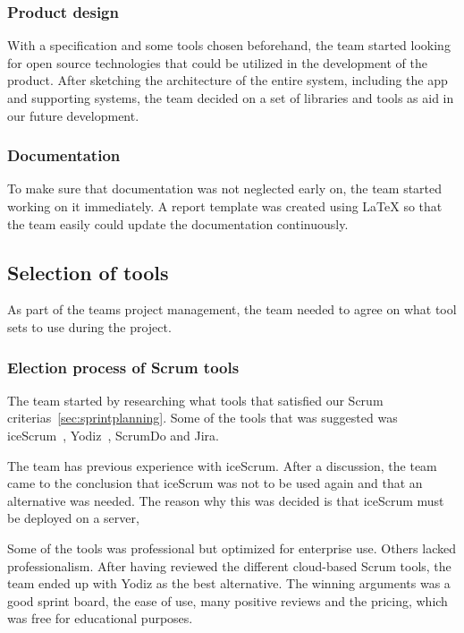 \subsubsection{Product design}
With a specification and some tools chosen beforehand, the team started looking for open source technologies that could be utilized in the development of the product. After sketching the architecture of the entire system, including the app and supporting systems, the team decided on a set of libraries and tools as aid in our future development.

\subsubsection{Documentation}
To make sure that documentation was not neglected early on, the team started working on it immediately. A report template was created using LaTeX so that the team easily could update the documentation continuously.


\subsection{Selection of tools}
As part of the teams project management, the team needed to agree on what tool sets to use during the project.

\subsubsection{Election process of Scrum tools}
\label{sec:scrumtools}
The team started by researching what tools that satisfied our Scrum criterias~\ref{sec:sprintplanning}. Some of the tools that was suggested was iceScrum~\cite{icescrum}, Yodiz~\cite{yodiz}, ScrumDo and Jira.

The team has previous experience with iceScrum. After a discussion, the team came to the conclusion that iceScrum was not to be used again and that an alternative was needed. The reason why this was decided is that iceScrum must be deployed on a server, 

Some of the tools was professional but optimized for enterprise use. Others lacked professionalism. After having reviewed the different cloud-based Scrum tools, the team ended up with Yodiz as the best alternative. The winning arguments was a good sprint board, the ease of use, many positive reviews and the pricing, which was free for educational purposes.

